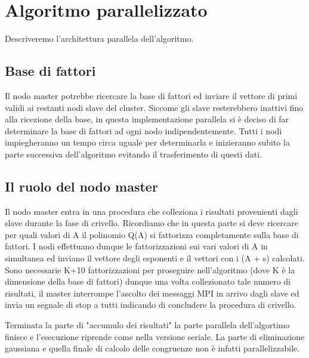 
\section{Algoritmo parallelizzato}
\label{sec:parallelo}
Descriveremo l'architettura parallela dell'algoritmo.
\subsection{Base di fattori}
Il nodo master potrebbe ricercare la base di fattori ed inviare il
vettore di primi validi ai restanti nodi slave del cluster. Siccome
gli slave resterebbero inattivi fino alla ricezione della base, in
questa implementazione parallela si è deciso di far determinare la
base di fattori ad ogni nodo indipendentemente. Tutti i nodi
impiegheranno un tempo circa uguale per determinarla e inizieranno
subito la parte successiva dell'algoritmo evitando il trasferimento di
questi dati.
\subsection{Il ruolo del nodo master}
Il nodo master entra in una procedura che colleziona i risultati
provenienti dagli slave durante la fase di crivello. Ricordiamo che in
questa parte si deve ricercare per quali valori di A il polinomio Q(A)
si fattorizza completamente sulla base di fattori. I nodi effettuano
dunque le fattorizzazioni sui vari valori di A in simultanea ed
inviano il vettore degli esponenti e il vettori con i (A + s)
calcolati. Sono necessarie K+10 fattorizzazioni per proseguire
nell'algoritmo (dove K è la dimensione della base di fattori) dunque
una volta collezionato tale numero di risultati, il master interrompe
l'ascolto dei messaggi MPI in arrivo dagli slave ed invia un segnale
di stop a tutti indicando di concludere la procedura di crivello.

Terminata la parte di "accumulo dei risultati" la parte parallela
dell'algortimo finisce e l'esecuzione riprende come nella versione
seriale. La parte di eliminazione gaussiana e quella finale di calcolo
delle congruenze non è infatti parallelizzabile.

